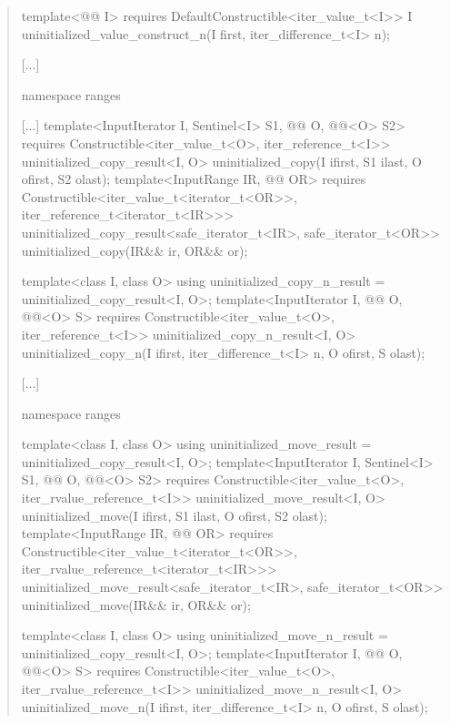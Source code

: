\begin{quote}
\begin{codeblock}
{    template<@@ I>
      requires DefaultConstructible<iter_value_t<I>>
        I uninitialized_value_construct_n(I first, iter_difference_t<I> n);
  }

  [...]

  namespace ranges {
    [...]
    template<InputIterator I, Sentinel<I> S1,
             @@ O,
             @@<O> S2>
        requires Constructible<iter_value_t<O>, iter_reference_t<I>>
      uninitialized_copy_result<I, O>
        uninitialized_copy(I ifirst, S1 ilast, O ofirst, S2 olast);
    template<InputRange IR, @@ OR>
        requires Constructible<iter_value_t<iterator_t<OR>>, iter_reference_t<iterator_t<IR>>>
      uninitialized_copy_result<safe_iterator_t<IR>, safe_iterator_t<OR>>
        uninitialized_copy(IR&& ir, OR&& or);

    template<class I, class O>
    using uninitialized_copy_n_result = uninitialized_copy_result<I, O>;
    template<InputIterator I, @@ O,
             @@<O> S>
        requires Constructible<iter_value_t<O>, iter_reference_t<I>>
      uninitialized_copy_n_result<I, O>
        uninitialized_copy_n(I ifirst, iter_difference_t<I> n, O ofirst, S olast);
  }

  [...]

  namespace ranges {
    template<class I, class O>
      using uninitialized_move_result = uninitialized_copy_result<I, O>;
    template<InputIterator I, Sentinel<I> S1,
             @@ O,
             @@<O> S2>
      requires Constructible<iter_value_t<O>, iter_rvalue_reference_t<I>>
      uninitialized_move_result<I, O>
        uninitialized_move(I ifirst, S1 ilast, O ofirst, S2 olast);
    template<InputRange IR, @@ OR>
      requires Constructible<iter_value_t<iterator_t<OR>>, iter_rvalue_reference_t<iterator_t<IR>>>
      uninitialized_move_result<safe_iterator_t<IR>, safe_iterator_t<OR>>
        uninitialized_move(IR&& ir, OR&& or);

    template<class I, class O>
      using uninitialized_move_n_result = uninitialized_copy_result<I, O>;
    template<InputIterator I, @@ O,
             @@<O> S>
      requires Constructible<iter_value_t<O>, iter_rvalue_reference_t<I>>
      uninitialized_move_n_result<I, O>
        uninitialized_move_n(I ifirst, iter_difference_t<I> n, O ofirst, S olast);
  }


\end{codeblock}
\end{quote}
